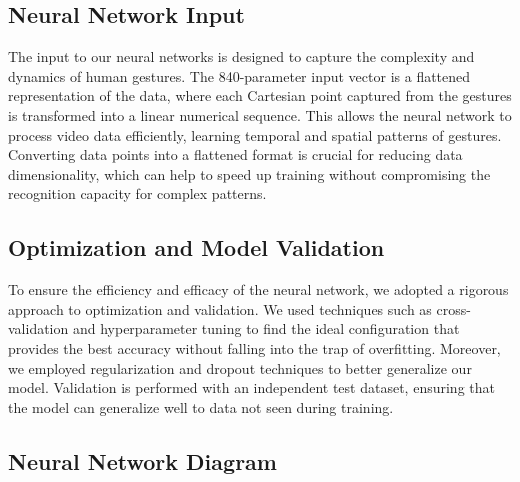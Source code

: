 \documentclass{article}
\begin{document}
\subsection{Neural Network Input}

The input to our neural networks is designed to capture the complexity and dynamics of human gestures. The 840-parameter input vector is a flattened representation of the data, where each Cartesian point captured from the gestures is transformed into a linear numerical sequence. This allows the neural network to process video data efficiently, learning temporal and spatial patterns of gestures. Converting data points into a flattened format is crucial for reducing data dimensionality, which can help to speed up training without compromising the recognition capacity for complex patterns.

\subsection{Optimization and Model Validation}

To ensure the efficiency and efficacy of the neural network, we adopted a rigorous approach to optimization and validation. We used techniques such as cross-validation and hyperparameter tuning to find the ideal configuration that provides the best accuracy without falling into the trap of overfitting. Moreover, we employed regularization and dropout techniques to better generalize our model. Validation is performed with an independent test dataset, ensuring that the model can generalize well to data not seen during training.

\subsection{Neural Network Diagram}

\end{document}
